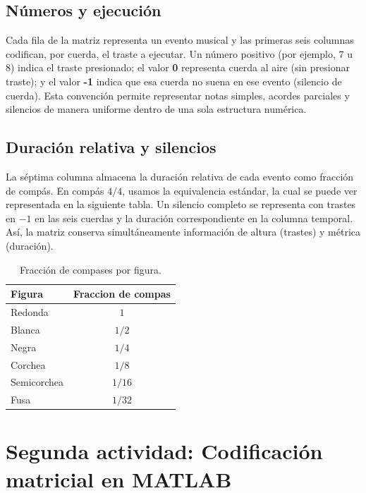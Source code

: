 \documentclass{article}
\theoremstyle{plain}
\theoremstyle{definition}
\begin{document}
\subsection*{Números y ejecución}
Cada fila de la matriz representa un evento musical y las primeras seis columnas codifican, por cuerda, el traste a ejecutar. Un número positivo (por ejemplo, 7 u 8) indica el traste presionado; el valor \textbf{0} representa cuerda al aire (sin presionar traste); y el valor \textbf{-1} indica que esa cuerda no suena en ese evento (silencio de cuerda). Esta convención permite representar notas simples, acordes parciales y silencios de manera uniforme dentro de una sola estructura numérica.

\subsection*{Duración relativa y silencios}
La séptima columna almacena la duración relativa de cada evento como fracción de compás. En compás \(4/4\), usamos la equivalencia estándar, la cual se puede ver representada en la siguiente tabla. Un silencio completo se representa con trastes en \(-1\) en las seis cuerdas y la duración correspondiente en la columna temporal. Así, la matriz conserva simultáneamente información de altura (trastes) y métrica (duración).

\begin{table}[]
	\centering
	\begin{tabular}{lc}
		\toprule
		\textbf{Figura} & \textbf{Fraccion de compas} \\
		\midrule
		Redonda         & $1$                         \\
		Blanca          & $1/2$                       \\
		Negra           & $1/4$                       \\
		Corchea         & $1/8$                       \\
		Semicorchea     & $1/16$                      \\
		Fusa            & $1/32$                      \\
		\bottomrule
	\end{tabular}
	\caption{Fracción de compases por figura.}
	\label{tab:placeholder}
\end{table}

\section*{Segunda actividad: Codificación matricial en MATLAB}
\end{document}
